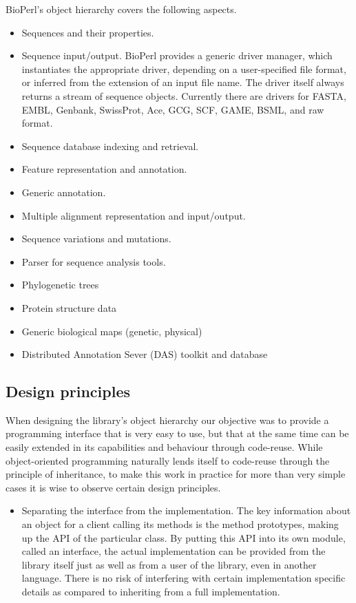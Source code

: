 \documentclass{article}
\begin{document}
\begin{twocolumn}
BioPerl's object hierarchy covers the following aspects.
\begin{itemize}
\item Sequences and their properties.
\item Sequence input/output.  BioPerl provides a generic driver
manager, which instantiates the appropriate driver, depending on a
user-specified file format, or inferred from the extension of an input
file name.  The driver itself always returns a stream of sequence
objects.  Currently there are drivers for FASTA, EMBL, Genbank, SwissProt,
Ace, GCG, SCF, GAME, BSML, and raw format.
\item Sequence database indexing and retrieval. 
\item Feature representation and annotation.
\item Generic annotation.
\item Multiple alignment representation and input/output.
\item Sequence variations and mutations.
\item Parser for sequence analysis tools.
\item Phylogenetic trees
\item Protein structure data
\item Generic biological maps (genetic, physical)
\item Distributed Annotation Sever (DAS) toolkit and database
\end{itemize}

\subsection{Design principles}

When designing the library's object hierarchy our objective was to
provide a programming interface that is very easy to use, but that at
the same time can be easily extended in its capabilities and behaviour
through code-reuse.  While object-oriented programming naturally lends
itself to code-reuse through the principle of inheritance, to make
this work in practice for more than very simple cases it is wise to
observe certain design principles. 

\begin{itemize}

\item Separating the interface from the implementation.  The key
information about an object for a client calling its methods is the
method prototypes, making up the API of the particular class.  By
putting this API into its own module, called an interface, the actual
implementation can be provided from the library itself just as well as
from a user of the library, even in another language.  There is no risk
of interfering with certain implementation specific details as
compared to inheriting from a full implementation.


\end{itemize}
\end{twocolumn}
\end{document}
